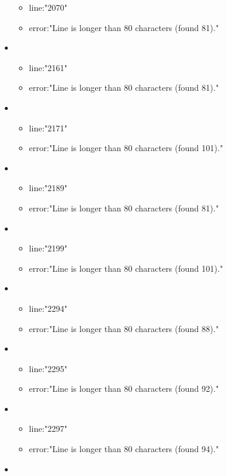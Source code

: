 \begin{itemize}
\begin{itemize}
		\item line:"2070" 
		\item error:"Line is longer than 80 characters (found 81)." 
	\end{itemize}
	\item 
	\begin{itemize} 
		\item line:"2161" 
		\item error:"Line is longer than 80 characters (found 81)." 
	\end{itemize}
	\item 
	\begin{itemize} 
		\item line:"2171" 
		\item error:"Line is longer than 80 characters (found 101)." 
	\end{itemize}
	\item 
	\begin{itemize} 
		\item line:"2189" 
		\item error:"Line is longer than 80 characters (found 81)." 
	\end{itemize}
	\item 
	\begin{itemize} 
		\item line:"2199" 
		\item error:"Line is longer than 80 characters (found 101)." 
	\end{itemize}
	\item 
	\begin{itemize} 
		\item line:"2294" 
		\item error:"Line is longer than 80 characters (found 88)." 
	\end{itemize}
	\item 
	\begin{itemize} 
		\item line:"2295" 
		\item error:"Line is longer than 80 characters (found 92)." 
	\end{itemize}
	\item 
	\begin{itemize} 
		\item line:"2297" 
		\item error:"Line is longer than 80 characters (found 94)." 
	\end{itemize}
	\item 
	\begin{itemize} 

\end{itemize}
\end{itemize}
